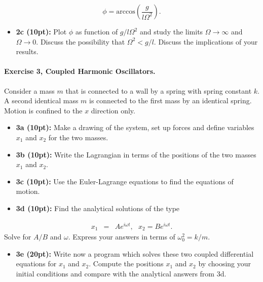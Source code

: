 \documentclass[%
oneside,                 %
final,                   %
10pt]{article}
\begin{document}
\noindent
\[
\phi=\mathrm{arccos}\left(\frac{g}{l\Omega^2}\right).
\]

\begin{itemize}
\item \textbf{2c (10pt):} Plot $\phi$ as function of $g/l\Omega^2$ and study the limits $\Omega\rightarrow \infty$ and $\Omega\rightarrow 0$. Discuss  the possibility that $\Omega^2 < g/l$. Discuss the implications of your results. 
\end{itemize}

\noindent
\paragraph{Exercise 3, Coupled Harmonic Oscillators.}
Consider a mass $m$ that is connected to a wall by a spring with
spring constant $k$. A second identical mass $m$ is connected to the
first mass by an identical spring. Motion is confined to the $x$ direction only.

\begin{itemize}
\item \textbf{3a (10pt):} Make a drawing of the system, set up forces and define variables $x_1$ and $x_2$ for the two masses.

\item \textbf{3b (10pt):} Write the Lagrangian in terms of the positions of the two masses $x_1$ and $x_2$.

\item \textbf{3c (10pt):} Use the Euler-Lagrange equations to find the  equations of motion.

\item \textbf{3d (10pt):} Find the analytical  solutions of the type
\end{itemize}

\noindent
\begin{eqnarray*}
x_1&=&Ae^{i\omega t},~~~x_2=Be^{i\omega t}.
\end{eqnarray*}
Solve for $A/B$ and $\omega$. Express your answers in terms of $\omega_0^2=k/m$.

\begin{itemize}
\item \textbf{3e (20pt):} Write now a program which solves these two coupled differential equations for $x_1$ and $x_2$. Compute the positions $x_1$ and $x_2$ by choosing your initial conditions and compare with the analytical answers from 3d.   
\end{itemize}

\noindent

\end{document}
